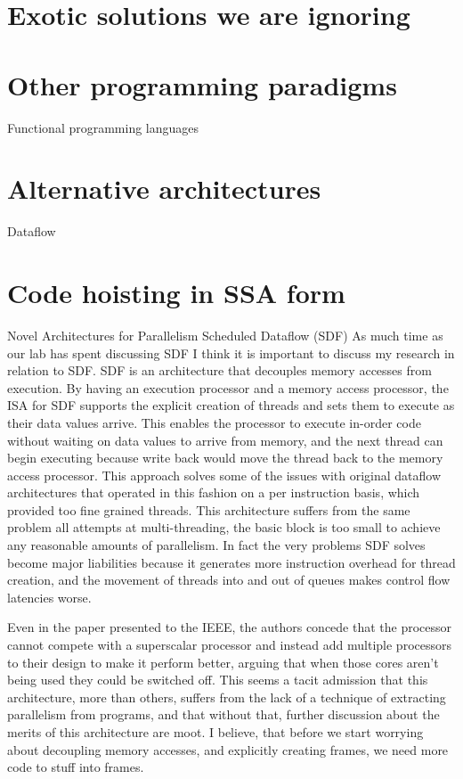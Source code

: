 \documentclass[12pt,twoside,letterpaper]{article}
\begin{document}
\section*{Exotic solutions we are ignoring}
\section*{Other programming paradigms}
Functional programming languages
\section*{Alternative architectures}
Dataflow

\section*{Code hoisting in SSA form}

Novel Architectures for Parallelism
Scheduled Dataflow (SDF)
As much time as our lab has spent discussing SDF I think it is important to discuss my research in relation to SDF. SDF is an architecture that decouples memory accesses from execution. By having an execution processor and a memory access processor, the ISA for SDF supports the explicit creation of threads and sets them to execute as their data values arrive. This enables the processor to execute in-order code without waiting on data values to arrive from memory, and the next thread can begin executing because write back would move the thread back to the memory access processor. This approach solves some of the issues with original dataflow architectures that operated in this fashion on a per instruction basis, which provided too fine grained threads. This architecture suffers from the same problem all attempts at multi-threading, the basic block is too small to achieve any reasonable amounts of parallelism. In fact the very problems SDF solves become major liabilities because it generates more instruction overhead for thread creation, and the movement of threads into and out of queues makes control flow latencies worse.

Even in the paper presented to the IEEE, the authors concede that the processor cannot compete with a superscalar processor and instead add multiple processors to their design to make it perform better, arguing that when those cores aren’t being used they could be switched off. This seems a tacit admission that this architecture, more than others, suffers from the lack of a technique of extracting parallelism from programs, and that without that, further discussion about the merits of this architecture are moot. I believe, that before we start worrying about decoupling memory accesses, and explicitly creating frames, we need  more code to stuff into frames. 
\end{document}
